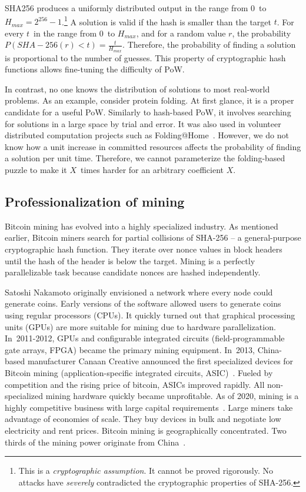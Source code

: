 SHA256 produces a uniformly distributed output in the range from $0$~to $H_{max} = 2^{256}-1$.\footnote{This is a \textit{cryptographic assumption}. It cannot be proved rigorously. No attacks have \textit{severely} contradicted the cryptographic properties of SHA-256.}
A solution is valid if the hash is smaller than the target $t$.
For every $t$~in the range from $0$~to $H_{max}$, and for a random value $r$, the probability $P(SHA-256(r) < t) = \frac{t}{H_{max}}$.
Therefore, the probability of finding a solution is proportional to the number of guesses.
This property of cryptographic hash functions allows fine-tuning the difficulty of PoW.

In contrast, no one knows the distribution of solutions to most real-world problems.
As an example, consider protein folding.
At first glance, it is a proper candidate for a useful PoW.
Similarly to hash-based PoW, it involves searching for solutions in a large space by trial and error.
It was also used in volunteer distributed computation projects such as Folding@Home~\cite{Beberg2009}.
However, we do not know how a unit increase in committed resources affects the probability of finding a solution per unit time.
Therefore, we cannot parameterize the folding-based puzzle to make it $X$~times harder for an arbitrary coefficient $X$.


\subsection{Professionalization of mining}

Bitcoin mining has evolved into a highly specialized industry.
As mentioned earlier, Bitcoin miners search for partial collisions of SHA-256 -- a general-purpose cryptographic hash function.
They iterate over nonce values in block headers until the hash of the header is below the target.
Mining is a perfectly parallelizable task because candidate nonces are hashed independently.

Satoshi Nakamoto originally envisioned a network where every node could generate coins.
Early versions of the software allowed users to generate coins using regular processors (CPUs).
It quickly turned out that graphical processing units (GPUs) are more suitable for mining due to hardware parallelization.
In~2011-2012, GPUs and configurable integrated circuits (field-programmable gate arrays, FPGA) became the primary mining equipment.
In~2013, China-based manufacturer Canaan Creative announced the first specialized devices for Bitcoin mining (application-specific integrated circuits, ASIC)~\cite{Kim2020}.
Fueled by competition and the rising price of bitcoin, ASICs improved rapidly.
All non-specialized mining hardware quickly became unprofitable.
As of 2020, mining is a highly competitive business with large capital requirements~\cite{Kroll2013}.
Large miners take advantage of economies of scale.
They buy devices in bulk and negotiate low electricity and rent prices.
Bitcoin mining is geographically concentrated.
Two thirds of the mining power originate from China~\cite{Rauchs2020}.

